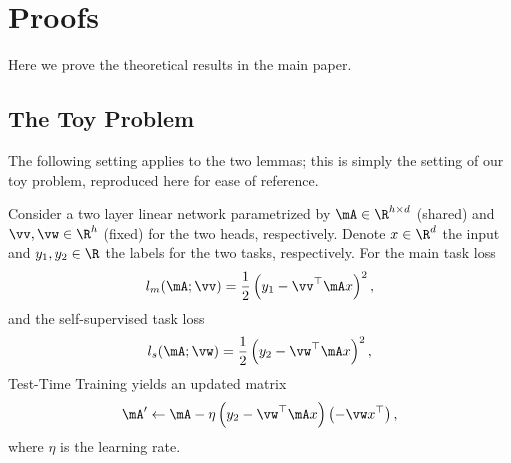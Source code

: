 \section{Proofs}
Here we prove the theoretical results in the main paper.
\subsection{The Toy Problem}
The following setting applies to the two lemmas; this is simply the setting of our toy problem, reproduced here for ease of reference.

\pagebreak
Consider a two layer linear network parametrized by $\mA\in\R^{h\times d}$ (shared) and $\vv, \vw\in\R^h$ (fixed) for the two heads, respectively.
Denote $x\in\R^d$ the input and $y_1, y_2\in\R$ the labels for the two tasks, respectively.
For the main task loss
\begin{equation}
l_m(\mA; \vv) = \frac{1}{2}\left(y_1 - \vv^\top \mA x\right)^2,
\end{equation}
and the self-supervised task loss
\begin{equation}
l_s(\mA; \vw) = \frac{1}{2}\left(y_2 - \vw^\top \mA x\right)^2,
\end{equation}
Test-Time Training yields an updated matrix
\begin{equation}
\mA' \leftarrow \mA - \eta\left( y_2-\vw^\top \mA x \right) \left(-\vw x^\top \right),
\end{equation}
where $\eta$ is the learning rate.

